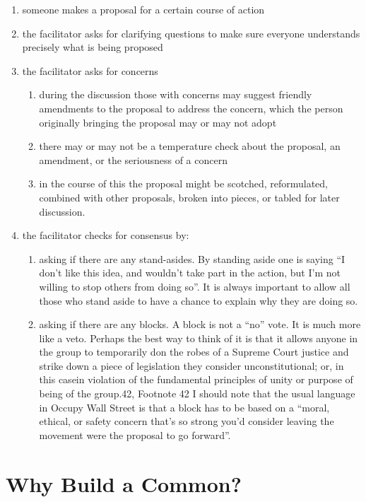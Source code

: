 \documentclass{article}
\begin{document}
\begin{enumerate}[]
	\item someone makes a proposal for a certain course of action
	\item  the facilitator asks for clarifying questions to make sure everyone understands precisely what is being proposed
	\item the facilitator asks for concerns
	\begin{enumerate}
		\item during the discussion those with concerns may suggest friendly amendments to the proposal to address the concern, which the person originally bringing the proposal may or may not adopt
		\item there may or may not be a temperature check about the proposal, an amendment, or the seriousness of a concern
		\item in the course of this the proposal might be scotched, reformulated, combined with other proposals, broken into pieces, or tabled for later discussion.
	\end{enumerate}
	\item the facilitator checks for consensus by:
	\begin{enumerate}
		\item asking if there are any stand-asides. By standing aside one is saying “I don’t like this idea, and wouldn’t take part in the action, but I’m not willing to stop others from doing so”. It is always important to allow all those who stand aside to have a chance to explain why they are doing so.
		\item asking if there are any blocks. A block is not a “no” vote. It is much more like a veto. Perhaps the best way to think of it is that it allows anyone in the group to temporarily don the robes of a Supreme Court justice and strike down a piece of legislation they consider unconstitutional; or, in this casein violation of the fundamental principles of unity or purpose of being of the group.{42},
		Footnote {42} I should note that the usual language in Occupy Wall Street is that a block has to be based on a “moral, ethical, or safety concern that’s so strong you’d consider leaving the movement were the proposal to go forward”.
	\end{enumerate}
\end{enumerate}

\pagebreak

\section{Why Build a Common?}
\end{document}
